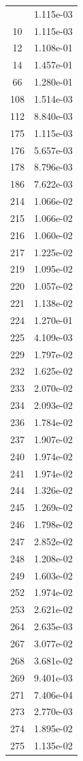 \documentclass[12pt]{article}
\begin{document}
\begin{longtable}{@{}cc@{}}
\bottomrule
\endlastfoot
7 & 1.115e-03 \\
10 & 1.115e-03 \\
12 & 1.108e-01 \\
14 & 1.457e-01 \\
66 & 1.280e-01 \\
108 & 1.514e-03 \\
112 & 8.840e-03 \\
175 & 1.115e-03 \\
176 & 5.657e-03 \\
178 & 8.796e-03 \\
186 & 7.622e-03 \\
214 & 1.066e-02 \\
215 & 1.066e-02 \\
216 & 1.060e-02 \\
217 & 1.225e-02 \\
219 & 1.095e-02 \\
220 & 1.057e-02 \\
221 & 1.138e-02 \\
224 & 1.270e-01 \\
225 & 4.109e-03 \\
229 & 1.797e-02 \\
232 & 1.625e-02 \\
233 & 2.070e-02 \\
234 & 2.093e-02 \\
236 & 1.784e-02 \\
237 & 1.907e-02 \\
240 & 1.974e-02 \\
241 & 1.974e-02 \\
244 & 1.326e-02 \\
245 & 1.269e-02 \\
246 & 1.798e-02 \\
247 & 2.852e-02 \\
248 & 1.208e-02 \\
249 & 1.603e-02 \\
252 & 1.974e-02 \\
253 & 2.621e-02 \\
264 & 2.635e-03 \\
267 & 3.077e-02 \\
268 & 3.681e-02 \\
269 & 9.401e-03 \\
271 & 7.406e-04 \\
273 & 2.770e-03 \\
274 & 1.895e-02 \\
275 & 1.135e-02 \\

\end{longtable}
\end{document}
